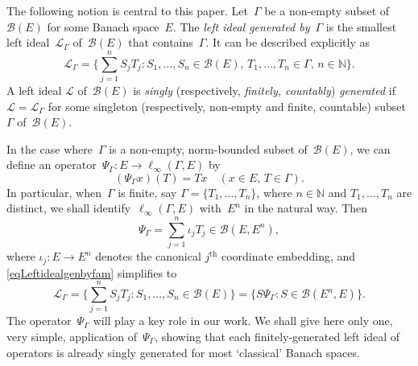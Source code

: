 \documentclass[12pt]{amsart}
\theoremstyle{definition}
\numberwithin{equation}{section}
\begin{document}
The following notion is central to this paper.  Let~$\Gamma$ be a
non-empty subset of~$\mathscr{B}(E)$ for some Banach space~$E$.  The
\emph{left ideal generated by}~$\Gamma$ is the smallest left
ideal~$\mathscr{L}_{\Gamma}$ of~$\mathscr{B}(E)$ that
contains~$\Gamma$. It can be described explicitly as
\begin{equation}\label{eqLeftidealgenbyfam}
  \mathscr{L}_{\Gamma} = \biggl\{ \sum_{j=1}^n S_jT_j :  
  S_1,\ldots,S_n\in\mathscr{B}(E),\,
  T_1,\ldots,T_n\in\Gamma, \,n\in{\ensuremath{\mathbb{N}}}\biggr\}.
\end{equation}
A left ideal $\mathscr{L}$ of~$\mathscr{B}(E)$ is \emph{singly}
(respectively, \emph{finitely, countably}) \emph{gen\-er\-ated} if
$\mathscr{L} = \mathscr{L}_{\Gamma}$ for some singleton (respectively,
non-empty and finite, countable) subset~$\Gamma$ of~$\mathscr{B}(E)$.

In the case where~$\Gamma$ is a non-empty, norm-bounded subset
of~$\mathscr{B}(E)$, we can define an operator~$\Psi_{\Gamma}\colon
E\to\ell_\infty(\Gamma,E)$ by
\begin{equation}\label{defnPsiInfinite}
  (\Psi_\Gamma x)(T) = Tx\quad (x\in E,\, T\in\Gamma). \end{equation}
In particular, when~$\Gamma$ is finite, say $\Gamma =
\{T_1,\ldots,T_n\}$, where $n\in{\ensuremath{\mathbb{N}}}$ and $T_1,\ldots,T_n$ are distinct,
we shall identify~$\ell_\infty(\Gamma,E)$ with~$E^n$ in the natural way. Then
\begin{equation}\label{defnOpPsi} \Psi_\Gamma =
  \sum_{j=1}^n \iota_j T_j\in\mathscr{B}(E,E^n),
\end{equation}
where $\iota_j\colon E\to E^n$ denotes the canonical $j^{\text{th}}$
coordinate embedding, and \eqref{eqLeftidealgenbyfam} simplifies to
\begin{equation}\label{eqFGLeftideal04072012}
  \mathscr{L}_{\Gamma} = \biggl\{ \sum_{j=1}^n S_jT_j :
  S_1,\ldots,S_n\in\mathscr{B}(E)\biggr\} = \bigl\{ S\Psi_{\Gamma} :
  S\in\mathscr{B}(E^n,E)\bigr\}.
\end{equation} 
The operator~$\Psi_\Gamma$ will play a key role in our work.  We
shall give here only one, very simple, application of~$\Psi_\Gamma$,
showing that each finitely-generated left ideal of operators is
already singly generated for most `classical' Banach spaces.
\end{document}
